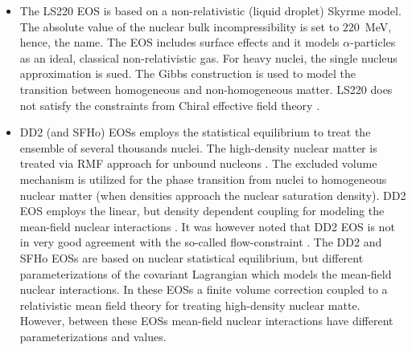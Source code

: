 \begin{itemize}
    \item The LS220 \ac{EOS} is based on a non-relativistic (liquid droplet) Skyrme model.
    The absolute value of the nuclear bulk incompressibility is set to $220$~MeV, hence, the name.
    The \ac{EOS} includes surface effects and it models $\alpha$-particles as an ideal, classical
    non-relativistic gas. For heavy nuclei, the single nucleus approximation is sued. 
    The Gibbs construction is used to model the transition between homogeneous and non-homogeneous matter.
    LS220 does not satisfy the constraints from Chiral effective field theory \citep{Hempel:2017ikt}.
    \item DD2 (and SFHo) \acp{EOS} employs the statistical equilibrium to treat the ensemble of several thousands nuclei.
    The high-density nuclear matter is treated via \ac{RMF} approach for unbound nucleons \citep{Hempel:2009mc}.
    The excluded volume mechanism is utilized for the phase transition from nuclei to homogeneous
    nuclear matter (when densities approach the nuclear saturation density).
    DD2 \ac{EOS} employs the linear, but density dependent coupling for modeling the mean-field nuclear interactions \citep{Typel:2009sy}.
    It was however noted that DD2 \ac{EOS} is not in very good agreement with the so-called 
    flow-constraint \citep{Danielewicz:2002pu}.
    The DD2 and SFHo \acp{EOS} are based on nuclear statistical equilibrium, but 
    different parameterizations of the covariant Lagrangian which models the mean-field nuclear interactions.
    In these \acp{EOS} a finite volume correction coupled to a relativistic mean field theory for treating high-density nuclear matte. However, between these \acp{EOS} mean-field nuclear interactions have different parameterizations and values.

\end{itemize}
